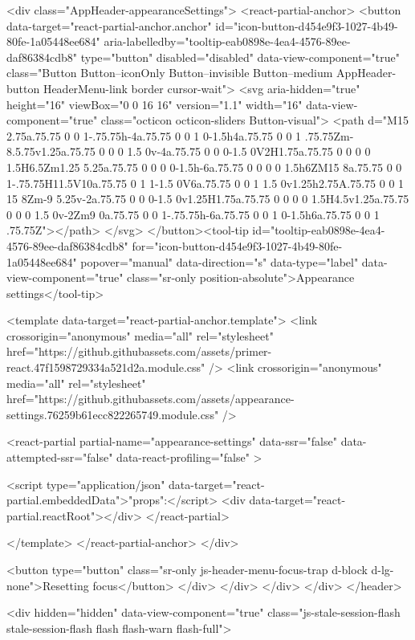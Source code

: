                 <div class="AppHeader-appearanceSettings">
    <react-partial-anchor>
      <button data-target="react-partial-anchor.anchor" id="icon-button-d454e9f3-1027-4b49-80fe-1a05448ee684" aria-labelledby="tooltip-eab0898e-4ea4-4576-89ee-daf86384cdb8" type="button" disabled="disabled" data-view-component="true" class="Button Button--iconOnly Button--invisible Button--medium AppHeader-button HeaderMenu-link border cursor-wait">  <svg aria-hidden="true" height="16" viewBox="0 0 16 16" version="1.1" width="16" data-view-component="true" class="octicon octicon-sliders Button-visual">
    <path d="M15 2.75a.75.75 0 0 1-.75.75h-4a.75.75 0 0 1 0-1.5h4a.75.75 0 0 1 .75.75Zm-8.5.75v1.25a.75.75 0 0 0 1.5 0v-4a.75.75 0 0 0-1.5 0V2H1.75a.75.75 0 0 0 0 1.5H6.5Zm1.25 5.25a.75.75 0 0 0 0-1.5h-6a.75.75 0 0 0 0 1.5h6ZM15 8a.75.75 0 0 1-.75.75H11.5V10a.75.75 0 1 1-1.5 0V6a.75.75 0 0 1 1.5 0v1.25h2.75A.75.75 0 0 1 15 8Zm-9 5.25v-2a.75.75 0 0 0-1.5 0v1.25H1.75a.75.75 0 0 0 0 1.5H4.5v1.25a.75.75 0 0 0 1.5 0v-2Zm9 0a.75.75 0 0 1-.75.75h-6a.75.75 0 0 1 0-1.5h6a.75.75 0 0 1 .75.75Z"></path>
</svg>
</button><tool-tip id="tooltip-eab0898e-4ea4-4576-89ee-daf86384cdb8" for="icon-button-d454e9f3-1027-4b49-80fe-1a05448ee684" popover="manual" data-direction="s" data-type="label" data-view-component="true" class="sr-only position-absolute">Appearance settings</tool-tip>

      <template data-target="react-partial-anchor.template">
        <link crossorigin="anonymous" media="all" rel="stylesheet" href="https://github.githubassets.com/assets/primer-react.47f1598729334a521d2a.module.css" />
<link crossorigin="anonymous" media="all" rel="stylesheet" href="https://github.githubassets.com/assets/appearance-settings.76259b61ecc822265749.module.css" />

<react-partial
  partial-name="appearance-settings"
  data-ssr="false"
  data-attempted-ssr="false"
  data-react-profiling="false"
>
  
  <script type="application/json" data-target="react-partial.embeddedData">{"props":{}}</script>
  <div data-target="react-partial.reactRoot"></div>
</react-partial>

      </template>
    </react-partial-anchor>
  </div>

          <button type="button" class="sr-only js-header-menu-focus-trap d-block d-lg-none">Resetting focus</button>
        </div>
      </div>
    </div>
  </div>
</header>

      <div hidden="hidden" data-view-component="true" class="js-stale-session-flash stale-session-flash flash flash-warn flash-full">
  
